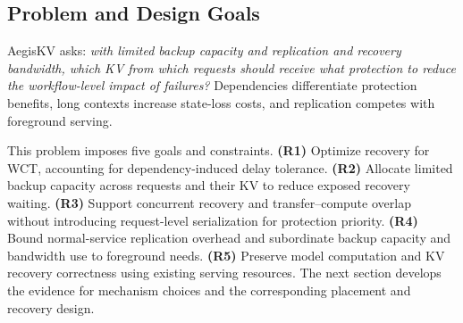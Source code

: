 \subsection{Problem and Design Goals}
\label{sec:motivation-goals}

AegisKV asks: \emph{with limited backup capacity and replication and
recovery bandwidth, which KV from which requests should receive what
protection to reduce the workflow-level impact of failures?}
Dependencies differentiate protection benefits, long contexts increase
state-loss costs, and replication competes with foreground serving.

This problem imposes five goals and constraints.
\textbf{(R1)} Optimize recovery for WCT, accounting for dependency-induced
delay tolerance.
\textbf{(R2)} Allocate limited backup capacity across requests and their
KV to reduce exposed recovery waiting.
\textbf{(R3)} Support concurrent recovery and transfer--compute overlap
without introducing request-level serialization for protection priority.
\textbf{(R4)} Bound normal-service replication overhead and subordinate
backup capacity and bandwidth use to foreground needs.
\textbf{(R5)} Preserve model computation and KV recovery correctness using
existing serving resources.
The next section develops the evidence for mechanism choices and the
corresponding placement and recovery design.
